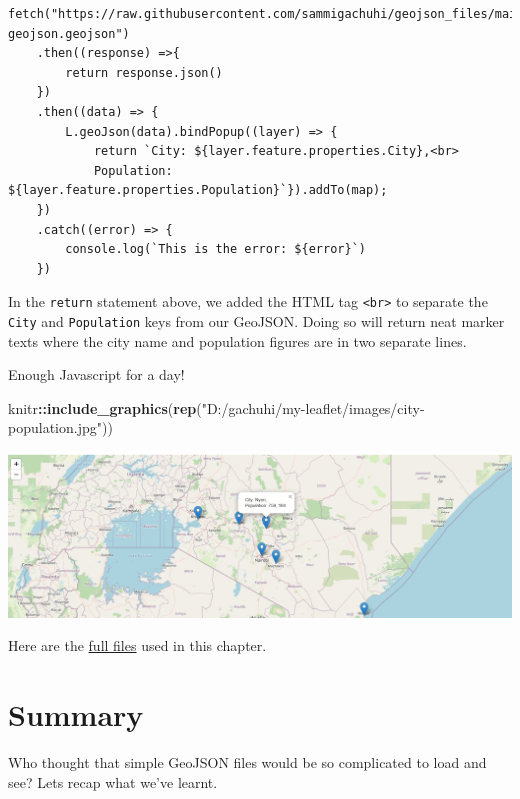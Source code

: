 \documentclass[
]{book}
\newenvironment{Shaded}{\begin{snugshade}}{\end{snugshade}}
\newcommand{\FunctionTok}[1]{\textcolor[rgb]{0.13,0.29,0.53}{\textbf{#1}}}
\newcommand{\NormalTok}[1]{#1}
\newcommand{\SpecialCharTok}[1]{\textcolor[rgb]{0.81,0.36,0.00}{\textbf{#1}}}
\newcommand{\StringTok}[1]{\textcolor[rgb]{0.31,0.60,0.02}{#1}}
\begin{document}
\begin{verbatim}
fetch("https://raw.githubusercontent.com/sammigachuhi/geojson_files/main/cities-geojson.geojson")
    .then((response) =>{
        return response.json()
    })
    .then((data) => {
        L.geoJson(data).bindPopup((layer) => {
            return `City: ${layer.feature.properties.City},<br>
            Population: ${layer.feature.properties.Population}`}).addTo(map);
    })
    .catch((error) => {
        console.log(`This is the error: ${error}`)
    })
\end{verbatim}

In the \texttt{return} statement above, we added the HTML tag \texttt{\textless{}br\textgreater{}} to separate the \texttt{City} and \texttt{Population} keys from our GeoJSON. Doing so will return neat marker texts where the city name and population figures are in two separate lines.

Enough Javascript for a day!

\begin{Shaded}
\begin{Highlighting}[]
\NormalTok{knitr}\SpecialCharTok{::}\FunctionTok{include\_graphics}\NormalTok{(}\FunctionTok{rep}\NormalTok{(}\StringTok{"D:/gachuhi/my{-}leaflet/images/city{-}population.jpg"}\NormalTok{))}
\end{Highlighting}
\end{Shaded}

\includegraphics{../images/city-population.jpg}

Here are the \href{https://github.com/sammigachuhi/my-leaflet-project/tree/main/my-leaflet-code/chapter-5-geojson-leaflet}{full files} used in this chapter.

\hypertarget{summary-4}{%
\section{Summary}\label{summary-4}}

Who thought that simple GeoJSON files would be so complicated to load and see? Lets recap what we've learnt.
\end{document}
